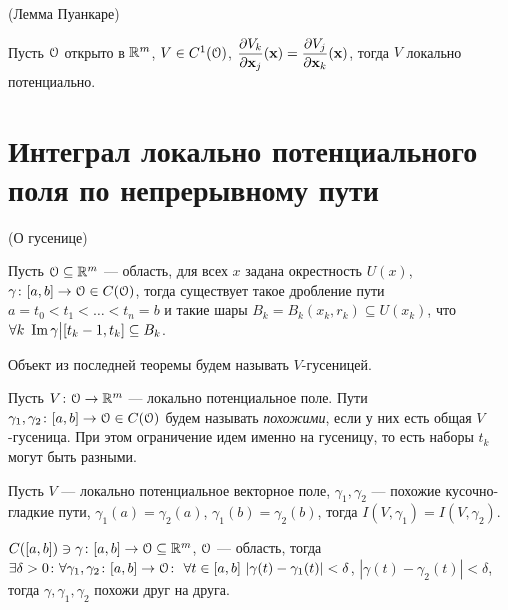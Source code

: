 \begin{corollary}(Лемма Пуанкаре)

    Пусть $\mathcal{O}$ открыто в $\mathbb{R}^m$, $V \in C^1(\mathcal{O})$, $\dfrac{\partial V_k}{\partial \mathbf{x}_j}(\mathbf{x}) =
    \dfrac{\partial V_j}{\partial \mathbf{x}_k}(\mathbf{x})$, тогда $V$ локально потенциально.
\end{corollary}

\section{Интеграл локально потенциального поля по непрерывному пути}

\begin{lemma}(О гусенице)

    Пусть $\mathcal{O} \subseteq \mathbb{R}^m$ --- область, для всех $x$ задана окрестность $U(x)$,
    $\gamma \colon [a, b] \to \mathcal{O} \in C(\mathcal{O})$, тогда существует такое дробление
    пути $a = t_0 < t_1 < \ldots < t_n = b$ и такие шары $B_k = B_k(x_k, r_k)
    \subseteq U(x_k)$, что $\forall k~ \operatorname{Im}{\gamma\big|[t_k - 1, t_k]} \subseteq
    B_k$.
\end{lemma}

\begin{definition}
    Объект из последней теоремы будем называть $V$-гусеницей.
\end{definition}

\begin{definition}
    Пусть $V \colon \mathcal{O} \to \mathbb{R}^m$ --- локально потенциальное поле. Пути \\ $\gamma_1,
    \gamma_2 \colon [a, b] \to \mathcal{O} \in C(\mathcal{O})$ будем называть \textit{похожими},
    если у них есть общая $V$-гусеница. При этом ограничение идем именно на
    гусеницу, то есть наборы $t_k$ могут быть разными.
\end{definition}

\begin{lemma}

    Пусть $V$ --- локально потенциальное векторное поле, $\gamma_1, \gamma_2$ ---
    похожие кусочно-гладкие пути, $\gamma_1(a) = \gamma_2(a)$,
    $\gamma_1(b) = \gamma_2(b)$, тогда $I(V, \gamma_1) = I(V, \gamma_2)$.
\end{lemma}

\begin{lemma}

    $C([a, b]) \ni \gamma \colon [a, b] \to \mathcal{O} \subseteq \mathbb{R}^m$, $\mathcal{O}$ --- область,
    тогда $\exists \delta > 0\colon~ \\ \forall \gamma_1, \gamma_2 \colon [a, b] \to
    \mathcal{O}\colon~ \forall t \in [a, b]~ |\gamma(t) - \gamma_1(t)| < \delta$,
    $|\gamma(t) - \gamma_2(t)| < \delta$, тогда $\gamma, \gamma_1, \gamma_2$ похожи
    друг на друга.
\end{lemma}

